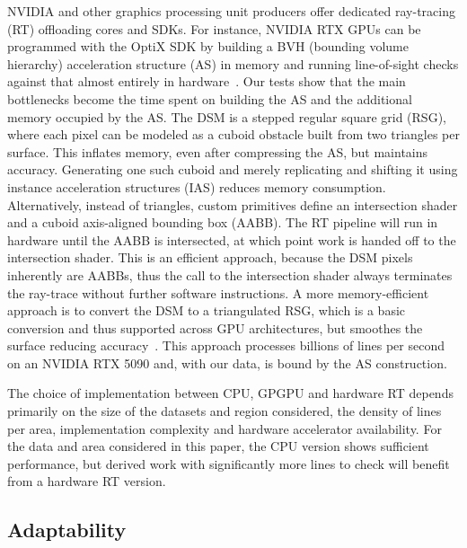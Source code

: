 NVIDIA and other graphics processing unit producers offer dedicated ray-tracing (RT) offloading cores and SDKs. For instance, NVIDIA RTX GPUs can be programmed with the OptiX SDK by building a BVH (bounding volume hierarchy) acceleration structure (AS) in memory and running line-of-sight checks against that almost entirely in hardware~\cite{optix}.
Our tests show that the main bottlenecks become the time spent on building the AS and the additional memory occupied by the AS.
The DSM is a stepped regular square grid (RSG), where each pixel can be modeled as a cuboid obstacle built from two triangles per surface.
This inflates memory, even after compressing the AS, but maintains accuracy.
Generating one such cuboid and merely replicating and shifting it using instance acceleration structures (IAS) reduces memory consumption.
Alternatively, instead of triangles, custom primitives define an intersection shader and a cuboid axis-aligned bounding box (AABB).
The RT pipeline will run in hardware until the AABB is intersected, at which point work is handed off to the intersection shader.
This is an efficient approach, because the DSM pixels inherently are AABBs, thus the call to the intersection shader always terminates the ray-trace without further software instructions.
A more memory-efficient approach is to convert the DSM to a triangulated RSG, which is a basic conversion and thus supported across GPU architectures, but smoothes the surface reducing accuracy~\cite{viscomp}.
This approach processes billions of lines per second on an NVIDIA RTX 5090 and, with our data, is bound by the AS construction.

The choice of implementation between CPU, GPGPU and hardware RT depends primarily on the size of the datasets and region considered, the density of lines per area, implementation complexity and hardware accelerator availability.
For the data and area considered in this paper, the CPU version shows sufficient performance, but derived work with significantly more lines to check will benefit from a hardware RT version.

\subsection*{Adaptability}\label{subsec:adaptability}
